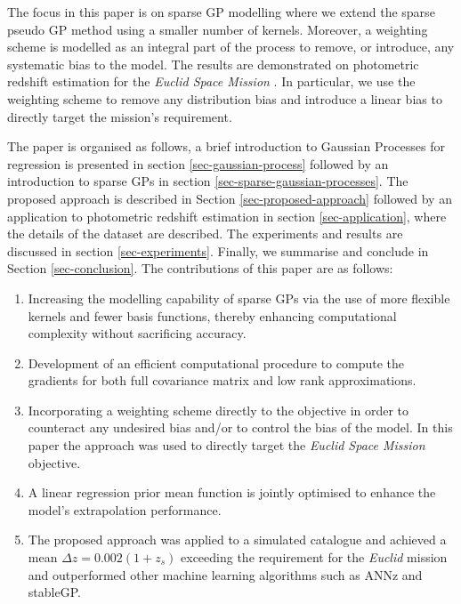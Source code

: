 \documentclass[useAMS,usenatbib,fleqn]{mn2e}
\begin{document}
The focus in this paper is on sparse GP modelling where we extend the sparse pseudo GP method using a smaller number of kernels. Moreover, a weighting scheme is modelled as an integral part of the process to remove, or introduce, any systematic bias to the model. The results are demonstrated on photometric redshift estimation for the {\em Euclid Space Mission} \citep{laureijs2011}. In particular, we use the weighting scheme to remove any distribution bias and introduce a linear bias to directly target the mission's requirement. 

The paper is organised as follows, a brief introduction to Gaussian Processes for regression is presented in section \ref{sec-gaussian-process} followed by an introduction to sparse GPs in section \ref{sec-sparse-gaussian-processes}. The proposed approach is described in Section \ref{sec-proposed-approach} followed by an application to photometric redshift estimation in section \ref{sec-application}, where the details of the dataset are described. The experiments and results are discussed in section \ref{sec-experiments}. Finally, we summarise and conclude in Section \ref{sec-conclusion}. The contributions of this paper are as follows:
\begin{enumerate}
  \item Increasing the modelling capability of sparse GPs via the use of more flexible kernels and fewer basis functions, thereby enhancing computational complexity without sacrificing accuracy.
  \item Development of an efficient computational procedure to compute the gradients for both full covariance matrix and low rank approximations.
  \item Incorporating a weighting scheme directly to the objective in order to counteract any undesired bias and/or to control the bias of the model. In this paper the approach was used to directly target the {\em Euclid Space Mission} objective.
  \item A linear regression prior mean function is jointly optimised to enhance the model's extrapolation performance.
  \item The proposed approach was applied to a simulated catalogue and achieved  a mean $\Delta z = 0.002(1+z_{s})$ exceeding the requirement for the {\em Euclid} mission and outperformed other machine learning algorithms such as ANNz and stableGP.
\end{enumerate}
\end{document}
